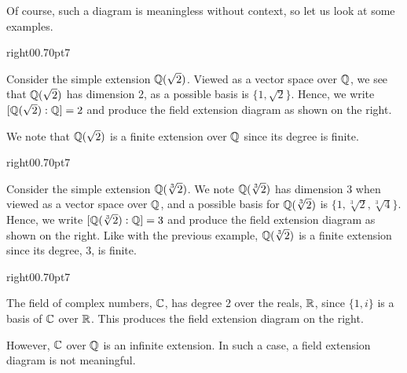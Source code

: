 Of course, such a diagram is meaningless without context, so let us look at some examples.

\begin{examplewithcutout}{right}{0}{0.7\textwidth}{0pt}{7}{
    \begin{figure}[H]
        \centering
    \end{figure}
}
    Consider the simple extension $\mathbb{Q}(\sqrt2)$. Viewed as a vector space over $\mathbb{Q}$, we see that $\mathbb{Q}(\sqrt 2)$ has dimension 2, as a possible basis is $\{1, \sqrt2\}$. Hence, we write $[\mathbb{Q}(\sqrt2):\mathbb{Q}] = 2$ and produce the field extension diagram as shown on the right.

    We note that $\mathbb{Q}(\sqrt2)$ is a finite extension over $\mathbb{Q}$ since its degree is finite.
\end{examplewithcutout}

\begin{examplewithcutout}{right}{0}{0.7\textwidth}{0pt}{7}{
    \begin{figure}[H]
        \centering
    \end{figure}
}
    Consider the simple extension $\mathbb{Q}(\sqrt[3]2)$. We note $\mathbb{Q}(\sqrt[3]2)$ has dimension 3 when viewed as a vector space over $\mathbb{Q}$, and a possible basis for $\mathbb{Q}(\sqrt[3]2)$ is $\{1, \sqrt[3]2, \sqrt[3]4\}$. Hence, we write $[\mathbb{Q}(\sqrt[3]2):\mathbb{Q}] = 3$ and produce the field extension diagram as shown on the right. Like with the previous example, $\mathbb{Q}(\sqrt[3]2)$ is a finite extension since its degree, 3, is finite.
\end{examplewithcutout}

\begin{examplewithcutout}{right}{0}{0.7\textwidth}{0pt}{7}{
    \begin{figure}[H]
        \centering
    \end{figure}
}
    The field of complex numbers, $\mathbb{C}$, has degree 2 over the reals, $\mathbb{R}$, since $\{1, i\}$ is a basis of $\mathbb{C}$ over $\mathbb{R}$. This produces the field extension diagram on the right.
    
    However, $\mathbb{C}$ over $\mathbb{Q}$ is an infinite extension. In such a case, a field extension diagram is not meaningful.
\end{examplewithcutout}

